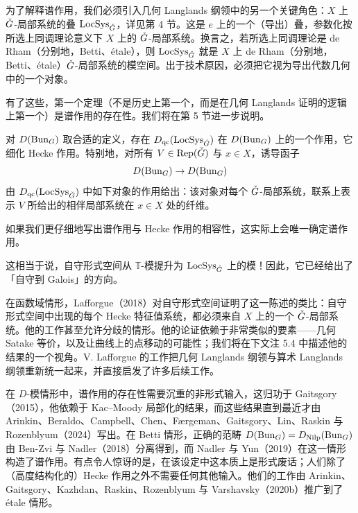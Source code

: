 为了解释谱作用，我们必须引入几何 Langlands 纲领中的另一个关键角色：$X$ 上 $\check{G}$-局部系统的叠 $\operatorname{LocSys}_{\check{G}}$，详见第 4 节。这是 $e$ 上的一个（导出）叠，参数化按所选上同调理论意义下 $X$ 上的 $\check{G}$-局部系统。换言之，若所选上同调理论是 de Rham（分别地，Betti、étale），则 $\operatorname{LocSys}_{\check{G}}$ 就是 $X$ 上 de Rham（分别地，Betti、étale）$\check{G}$-局部系统的模空间。出于技术原因，必须把它视为导出代数几何中的一个对象。

有了这些，第一个定理（不是历史上第一个，而是在几何 Langlands 证明的逻辑上第一个）是谱作用的存在性。我们将在第 5 节进一步说明。

\begin{theorem}
对 $D(\operatorname{Bun}_G)$ 取合适的定义，存在 $D_{\mathrm{qc}}(\operatorname{LocSys}_{\check{G}})$ 在 $D(\operatorname{Bun}_G)$ 上的一个作用，它细化 Hecke 作用。特别地，对所有 $V \in \operatorname{Rep}(\check{G})$ 与 $x \in X$，诱导函子
\[
D(\operatorname{Bun}_G) \to D(\operatorname{Bun}_G)
\]
由 $D_{\mathrm{qc}}(\operatorname{LocSys}_{\check{G}})$ 中如下对象的作用给出：该对象对每个 $\check{G}$-局部系统，联系上表示 $V$ 所给出的相伴局部系统在 $x \in X$ 处的纤维。
\end{theorem}

\begin{remark}
如果我们更仔细地写出谱作用与 Hecke 作用的相容性，这实际上会唯一确定谱作用。

这相当于说，自守形式空间从 $\mathbb{T}$-模提升为 $\operatorname{LocSys}_{\check{G}}$ 上的模！因此，它已经给出了「自守到 Galois」的方向。
\end{remark}

\begin{remark}
在函数域情形，Lafforgue（2018）对自守形式空间证明了这一陈述的类比：自守形式空间中出现的每个 Hecke 特征值系统，都必须来自 $X$ 上的一个 $\check{G}$-局部系统。他的工作甚至允许分歧的情形。他的论证依赖于非常类似的要素——几何 Satake 等价，以及让曲线上的点移动的可能性；我们将在下文注 5.4 中描述他的结果的一个视角。V. Lafforgue 的工作把几何 Langlands 纲领与算术 Langlands 纲领重新统一起来，并直接启发了许多后续工作。

在 $D$-模情形中，谱作用的存在性需要沉重的非形式输入，这归功于 Gaitsgory（2015），他依赖于 Kac–Moody 局部化的结果，而这些结果直到最近才由 Arinkin、Beraldo、Campbell、Chen、Færgeman、Gaitsgory、Lin、Raskin 与 Rozenblyum（2024）写出。在 Betti 情形，正确的范畴 $D(\operatorname{Bun}_G) = D_{\mathrm{Nilp}}(\operatorname{Bun}_G)$ 由 Ben-Zvi 与 Nadler（2018）分离得到，而 Nadler 与 Yun（2019）在这一情形构造了谱作用。有点令人惊讶的是，在该设定中这本质上是形式废话；人们除了（高度结构化的）Hecke 作用之外不需要任何其他输入。他们的工作由 Arinkin、Gaitsgory、Kazhdan、Raskin、Rozenblyum 与 Varshavsky（2020b）推广到了 étale 情形。
\end{remark}

